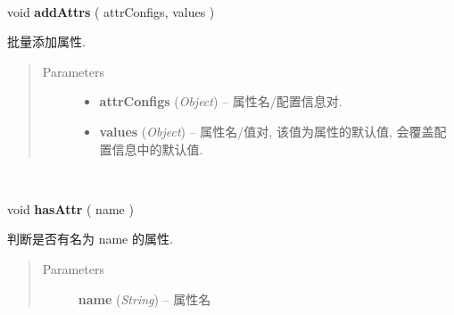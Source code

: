 \documentclass[letterpaper,10pt,english]{sphinxmanual}
\begin{document}

\begin{fulllineitems}
\label{api/core/base/attribute:attribute.addAttrs}~
\begin{DUlineblock}{0em}
\item[] void \textbf{addAttrs} ( attrConfigs, values )
\item[] 批量添加属性.
\end{DUlineblock}
\begin{quote}\begin{description}
\item[{Parameters}] \leavevmode\begin{itemize}
\item {}
\textbf{attrConfigs} (\emph{Object}) -- 属性名/配置信息对.

\item {}
\textbf{values} (\emph{Object}) -- 属性名/值对, 该值为属性的默认值, 会覆盖配置信息中的默认值.

\end{itemize}

\end{description}\end{quote}

\end{fulllineitems}



\begin{fulllineitems}
\label{api/core/base/attribute:attribute.hasAttr}~
\begin{DUlineblock}{0em}
\item[] void \textbf{hasAttr} ( name )
\item[] 判断是否有名为 name 的属性.
\end{DUlineblock}
\begin{quote}\begin{description}
\item[{Parameters}] \leavevmode
\textbf{name} (\emph{String}) -- 属性名

\end{description}\end{quote}

\end{fulllineitems}


\end{document}
